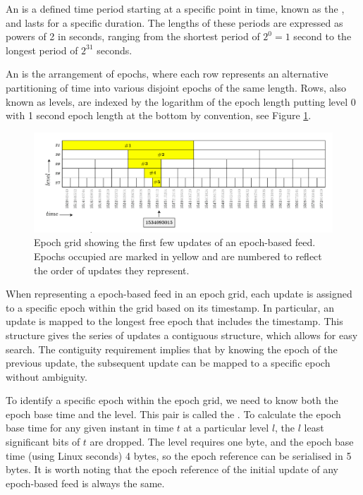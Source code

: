 An  is a defined time period starting at a specific point in time, known as the , and lasts for a specific duration.  
The lengths of these periods are expressed as powers of 2 in seconds, ranging from the shortest period of $2^0 = 1$ second to the longest period of $2^{31}$ seconds. 

An  is the arrangement of epochs, where each row represents an alternative partitioning of time into various disjoint epochs of the same length. Rows, also known as levels, are indexed by the logarithm of the epoch length putting level 0 with 1 second epoch length at the bottom by convention, see Figure \ref{fig:epoch-grid}.

\begin{figure}[htbp]
\centering
\includegraphics[width=\textwidth]{fig/epoch-grid_new.pdf}
\caption[Epoch grid with epoch-based feed updates\statusorange]{Epoch grid showing the first few updates of an epoch-based feed. Epochs occupied are marked in yellow and are numbered to reflect the order of updates they represent. }
\label{fig:epoch-grid}
\end{figure}

When representing a epoch-based feed in an epoch grid, each update is assigned to a specific epoch within the grid based on its timestamp. In particular, an update is mapped to the longest free epoch that includes the timestamp. This structure gives the series of updates a contiguous structure, which allows for easy search. The contiguity requirement implies that by knowing the epoch of the previous update, the subsequent update can be mapped to a specific epoch without ambiguity.


To identify a specific epoch within the epoch grid, we need to know both the epoch base time and the level. This pair is called the  . To calculate the epoch base time for any given instant in time $t$ at a particular level $l$, the $l$ least significant bits of $t$ are dropped. 
The level requires one byte, and the epoch base time (using Linux seconds) 4 bytes, so the epoch reference can be serialised in 5 bytes. 
It is worth noting that the epoch reference of the initial update of any epoch-based feed is always the same.

